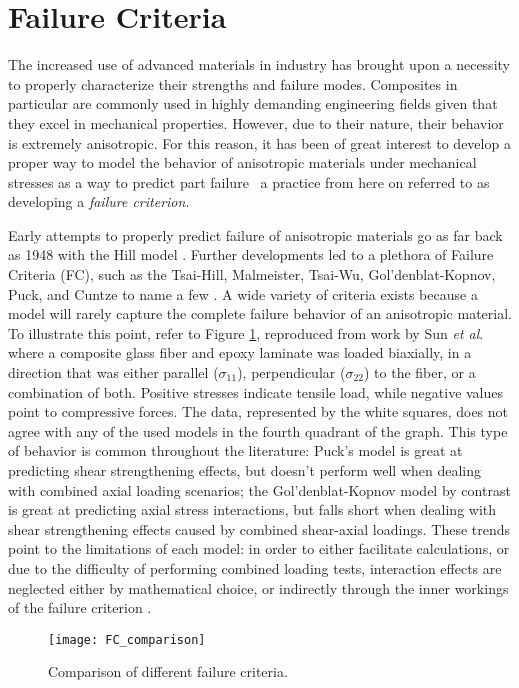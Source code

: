\documentclass[main.tex]{subfiles}
\begin{document}
\section{Failure Criteria}\label{sec:FC}   
The increased use of advanced materials in industry has brought upon a necessity to properly characterize their strengths and failure modes. Composites in particular are commonly used in highly demanding engineering fields given that they excel in mechanical properties. However, due to their nature, their behavior is extremely anisotropic. For this reason, it has been of great interest to develop a proper way to model the behavior of anisotropic materials under mechanical stresses as a way to predict part failure \textendash~a practice from here on referred to as developing a \emph{failure criterion}. 

Early attempts to properly predict failure of anisotropic materials go as far back as 1948 with the Hill model \cite{Osswald2017a}. Further developments led to a plethora of Failure Criteria (FC), such as the Tsai-Hill, Malmeister, Tsai-Wu, Gol'denblat-Kopnov, Puck, and Cuntze to name a few \cite{Osswald2017a,Osswald2015}. A wide variety of criteria exists because a model will rarely capture the complete failure behavior of an anisotropic material. To illustrate this point, refer to Figure \ref{fig:FCComp}, reproduced from work by Sun \emph{et al}. \cite{Sun1996} where a composite glass fiber and epoxy laminate was loaded biaxially, in a direction that was either parallel ($\sigma_{11}$), perpendicular ($\sigma_{22}$) to the fiber, or a combination of both. Positive stresses indicate tensile load, while negative values point to compressive forces. The data, represented by the white squares, does not agree with any of the used models in the fourth quadrant of the graph. This type of behavior is common throughout the literature: Puck's model is great at predicting shear strengthening effects, but doesn't perform well when dealing with combined axial loading scenarios; the Gol'denblat-Kopnov model by contrast is great at predicting axial stress interactions, but falls short when dealing with shear strengthening effects caused by combined shear-axial loadings. These trends point to the limitations of each model: in order to either facilitate calculations, or due to the difficulty of performing combined loading tests, interaction effects are neglected either by mathematical choice, or indirectly through the inner workings of the failure criterion \cite{Osswald2017a}.  

\begin{figure}[h]
	\center
	\texttt{[image: FC\_comparison]}
	\caption{Comparison of different failure criteria. \cite{Sun1996}} \label{fig:FCComp}
\end{figure}     
\end{document}

